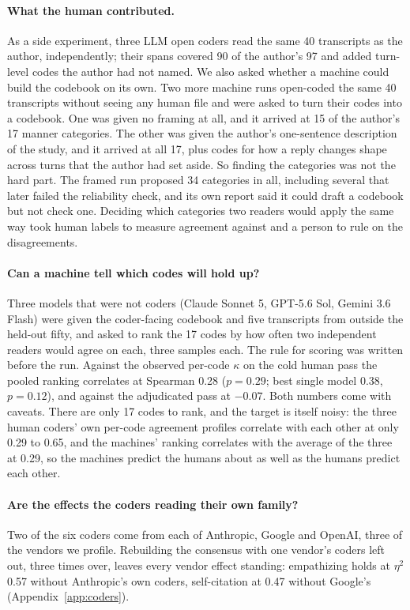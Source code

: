 \documentclass[11pt]{article}
\begin{document}
\paragraph{What the human contributed.} As a side experiment, three LLM open coders read the
same 40 transcripts as the author, independently; their spans covered 90 of the author's 97 and
added turn-level codes the author had not named. We also asked whether a machine could build the codebook on its own. Two more machine
runs open-coded the same 40 transcripts without seeing any human file and were asked to turn their
codes into a codebook. One was given no framing at all, and it arrived at 15 of the author's 17
manner categories. The other was given the author's one-sentence description of the study, and it
arrived at all 17, plus codes for how a reply changes shape across turns that the author had set
aside. So finding the categories was not the hard part. The framed run proposed 34 categories in
all, including several that later failed the reliability check, and its own report said it could
draft a codebook but not check one. Deciding which categories two readers would apply the same way
took human labels to measure agreement against and a person to rule on the disagreements.

\paragraph{Can a machine tell which codes will hold up?} Three models that were not
coders (Claude Sonnet 5, GPT-5.6 Sol, Gemini 3.6 Flash) were given the coder-facing codebook and
five transcripts from outside the held-out fifty, and asked to rank the 17 codes by how often two
independent readers would agree on each, three
samples each. The rule for scoring was written before the run. Against the observed per-code
$\kappa$ on the cold human pass the pooled ranking correlates at Spearman 0.28 ($p=0.29$; best
single model 0.38, $p=0.12$), and against the adjudicated pass at $-0.07$. Both numbers come with caveats. There are only 17 codes to rank, and
the target is itself noisy: the three human coders' own per-code agreement profiles correlate with
each other at only 0.29 to 0.65, and the machines' ranking correlates with the average of the three
at 0.29, so the machines predict the humans about as well as the humans predict each other. 

\paragraph{Are the effects the coders reading their own family?} Two of the six coders come from
each of Anthropic, Google and OpenAI, three of the vendors we profile. Rebuilding the consensus
with one vendor's coders left out, three times over, leaves every vendor effect standing:
empathizing holds at $\eta^2$ 0.57 without Anthropic's own coders, self-citation at 0.47 without
Google's (Appendix~\ref{app:coders}).
\end{document}
